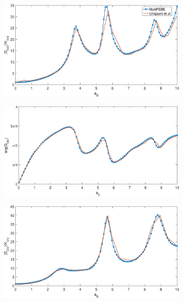 \documentclass[a4]{article}
\begin{document}
\begin{figure}[tbh!]
	\centering
	\begin{subfigure}[b]{0.48\textwidth}
		\centering
		\includegraphics[width=\textwidth]{Shh.eps}
		\label{fig:Shh}
	\end{subfigure}
	\begin{subfigure}[b]{0.48\textwidth}
		\centering
		\includegraphics[width=\textwidth]{arg_Shh.eps}
		\label{fig:arg_Shh}
	\end{subfigure}
	\begin{subfigure}[b]{0.48\textwidth}
		\centering
		\includegraphics[width=\textwidth]{Svv.eps}

\end{subfigure}
\end{figure}
\end{document}
